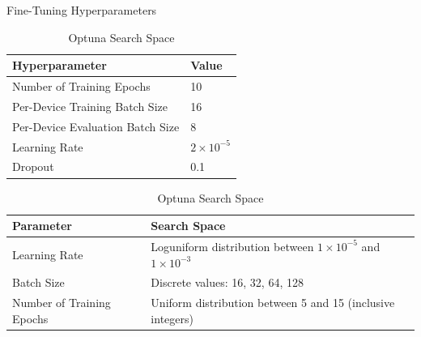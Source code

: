 \documentclass[10pt,twocolumn,letterpaper]{article}
\begin{document}
\begin{table}[H]

    \begin{minipage}[t]{0.45\textwidth}
    \centering
    \caption{Fine-Tuning Hyperparameters}
    \begin{tabular}{|l|l|}
    \hline
    \textbf{Hyperparameter} & \textbf{Value} \\
    \hline
    Number of Training Epochs & 10 \\
    Per-Device Training Batch Size & 16 \\
    Per-Device Evaluation Batch Size & 8 \\
    Learning Rate & $2 \times 10^{-5}$ \\
    Dropout & 0.1 \\
    \hline
    \end{tabular}
    \label{table:fine_tuning_hyperparameters}
    \end{minipage}
    \hfill
    \begin{minipage}[t]{0.45\textwidth}
    \centering
    \caption{Optuna Search Space}
    \begin{tabular}{|l|p{5cm}|}
    \hline
    \textbf{Parameter} & \textbf{Search Space} \\
    \hline
    Learning Rate & Loguniform distribution between $1 \times 10^{-5}$ and $1 \times 10^{-3}$ \\
    Batch Size & Discrete values: 16, 32, 64, 128 \\
    Number of Training Epochs & Uniform distribution between 5 and 15 (inclusive integers) \\
    \hline
    \end{tabular}
    \label{table:optuna_search_space}
    \end{minipage}
    
    \end{table}
\end{document}
